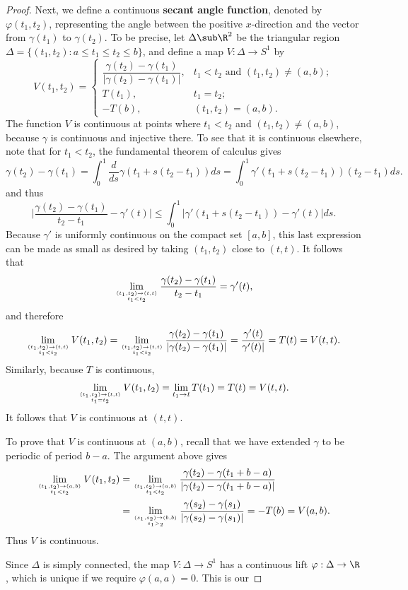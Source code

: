 \begin{proof}
Next, we define a continuous \textbf{secant angle function}, denoted by $\varphi(t_1,t_2)$, representing the angle between the positive $x$-direction and the vector 
from $\gamma(t_1)$ to $\gamma(t_2)$. To be precise, let $\Delta\sub\R^2$ be the triangular region $\Delta=\{(t_1,t_2):a\leq t_1\leq t_2\leq b\}$, and define a map $V:\Delta\to S^1$ by
\[V(t_1,t_2)=\begin{cases}
\dfrac{\gamma(t_2)-\gamma(t_1)}{|\gamma(t_2)-\gamma(t_1)|},&t_1<t_2\text{ and }(t_1,t_2)\neq(a,b);\\
T(t_1),&t_1=t_2;\\
-T(b),&(t_1,t_2)=(a,b).
\end{cases}\]
The function $V$ is continuous at points where $t_1<t_2$ and $(t_1,t_2)\neq(a,b)$, because $\gamma$ is continuous and injective there. To see that it is continuous 
elsewhere, note that for $t_1<t_2$, the fundamental theorem of calculus gives
\[\gamma(t_2)-\gamma(t_1)=\int_{0}^{1}\frac{d}{ds}\gamma(t_1+s(t_2-t_1))ds=\int_{0}^{1}\gamma'(t_1+s(t_2-t_1))(t_2-t_1)ds.\]
and thus
\[\Big|\frac{\gamma(t_2)-\gamma(t_1)}{t_2-t_1}-\gamma'(t)\Big|\leq\int_{0}^{1}|\gamma'(t_1+s(t_2-t_1))-\gamma'(t)|ds.\]
Because $\gamma'$ is uniformly continuous on the compact set $[a,b]$, this last expression can be made as small as desired by taking $(t_1,t_2)$ close to $(t,t)$. It 
follows that
\[\lim_{(t_1,t_2)\to(t,t)\atop t_1<t_2}\frac{\gamma(t_2)-\gamma(t_1)}{t_2-t_1}=\gamma'(t),\]
and therefore
\[\lim_{(t_1,t_2)\to(t,t)\atop t_1<t_2}V(t_1,t_2)=\lim_{(t_1,t_2)\to(t,t)\atop t_1<t_2}\frac{\gamma(t_2)-\gamma(t_1)}{|\gamma(t_2)-\gamma(t_1)|}=\frac{\gamma'(t)}{\gamma'(t)|}=T(t)=V(t,t).\]
Similarly, because $T$ is continuous,
\[\lim_{(t_1,t_2)\to(t,t)\atop t_1=t_2}V(t_1,t_2)=\lim_{t_1\to t}T(t_1)=T(t)=V(t,t).\]
It follows that $V$ is continuous at $(t,t)$.\par
To prove that $V$ is continuous at $(a,b)$, recall that we have extended $\gamma$ to be periodic of period $b-a$. The argument above gives
\begin{align*}
\lim_{(t_1,t_2)\to(a,b)\atop t_1<t_2}V(t_1,t_2)&=\lim_{(t_1,t_2)\to(a,b)\atop t_1<t_2}\frac{\gamma(t_2)-\gamma(t_1+b-a)}{|\gamma(t_2)-\gamma(t_1+b-a)|}\\
&=\lim_{(s_1,s_2)\to(b,b)\atop s_1>_2}\frac{\gamma(s_2)-\gamma(s_1)}{|\gamma(s_2)-\gamma(s_1)|}=-T(b)=V(a,b).
\end{align*}
Thus $V$ is continuous.\par
Since $\Delta$ is simply connected, the map $V:\Delta\to S^1$ has a continuous lift $\varphi:\Delta\to\R$, which is unique if we require $\varphi(a,a)=0$. This is our 

\end{proof}

